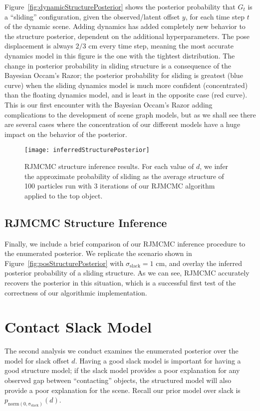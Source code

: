 Figure~\ref{fig:dynamicStructurePosterior} shows the posterior probability that $G_t$ is a ``sliding'' configuration, given the observed/latent offset $y$, for each time step $t$ of the dynamic scene.
Adding dynamics has added completely new behavior to the structure posterior, dependent on the additional hyperparameters.
The pose displacement is always $2/3$ cm every time step, meaning the most accurate dynamics model in this figure is the one with the tightest distribution.
The change in posterior probability in sliding structure is a consequence of the Bayesian Occam's Razor; the posterior probability for sliding is greatest (blue curve) when the sliding dynamics model is much more confident (concentrated) than the floating dynamics model, and is least in the opposite case (red curve).
This is our first encounter with the Bayesian Occam's Razor adding complications to the development of scene graph models, but as we shall see there are several cases where the concentration of our different models have a huge impact on the behavior of the posterior.

\begin{figure}[H]
  \texttt{[image: inferredStructurePosterior]}
  \caption{
    RJMCMC structure inference results.
    For each value of $d$, we infer the approximate probability of sliding as the average structure of 100 particles run with 3 iterations of our RJMCMC algorithm applied to the top object.
  }
  \label{fig:inferredStructurePosterior}
\end{figure}

\subsection{RJMCMC Structure Inference}
Finally, we include a brief comparison of our RJMCMC inference procedure to the enumerated posterior.
We replicate the scenario shown in Figure~\ref{fig:posStructurePosterior} with $\sigma_\mathrm{slack} = 1$ cm, and overlay the inferred posterior probability of a sliding structure.
As we can see, RJMCMC accurately recovers the posterior in this situation, which is a successful first test of the correctness of our algorithmic implementation.

\section{Contact Slack Model}
The second analysis we conduct examines the enumerated posterior over the model for slack offset $d$.
Having a good slack model is important for having a good structure model; if the slack model provides a poor explanation for any observed gap between ``contacting'' objects, the structured model will also provide a poor explanation for the scene.
Recall our prior model over slack is $p_\mathrm{norm(0,\sigma_\mathrm{slack})}(d)$.

